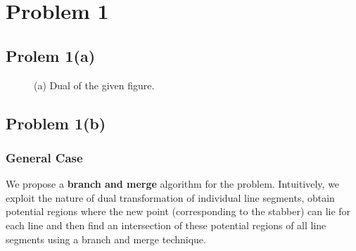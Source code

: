 \section{Problem 1}
\subsection{Prolem 1(a)}

\begin{figure}[H]
	\caption{(a) Dual of the given figure.  } 
	\label{fig:dualq1}
\end{figure}


\subsection{Problem 1(b)}
\subsubsection{General Case}
We propose a \textbf{branch and merge} algorithm for the problem. Intuitively, we exploit the nature of dual transformation of individual line segments, obtain potential regions where the new point (corresponding to the stabber) can lie for each line and then find an intersection of these potential regions of all line segments using a branch and merge technique. 


